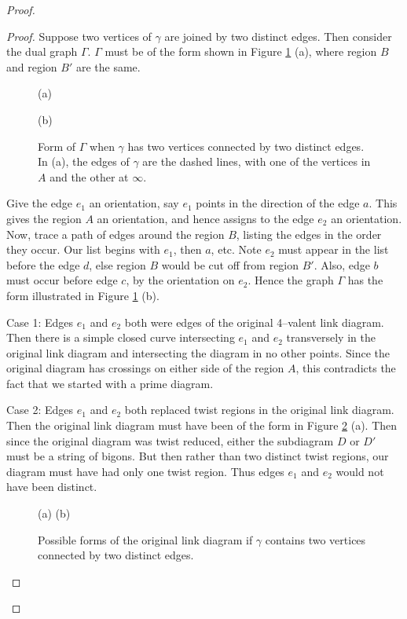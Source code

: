 \begin{proof}
\begin{proof}
Suppose two vertices of $\gamma$ are joined by two distinct edges.
Then consider the dual graph $\Gamma$.  $\Gamma$ must be of the form
shown in Figure \ref{fig:Andr_double_edge} (a), where region $B$ and
region $B'$ are the same.

\begin{figure}
  \begin{center}
    (a)
  
  \hspace{.5in}
  (b)
  
 
  \end{center}
  \caption{Form of $\Gamma$ when $\gamma$ has two vertices
  connected by two distinct edges.  In (a), the edges of $\gamma$ are
  the dashed lines, with one of the vertices in $A$ and the other at
  $\infty$.}
  \label{fig:Andr_double_edge}
\end{figure}

Give the edge $e_1$ an orientation, say $e_1$ points in the direction
of the edge $a$.  This gives the region $A$ an orientation, and hence
assigns to the edge $e_2$ an orientation.  Now, trace a path of edges
around the region $B$, listing the edges in the order they occur.  Our
list begins with $e_1$, then $a$, etc.  Note $e_2$ must appear in the
list before the edge $d$, else region $B$ would be cut off from region
$B'$.  Also, edge $b$ must occur before edge $c$, by the orientation
on $e_2$.  Hence the graph $\Gamma$ has the form illustrated in Figure
\ref{fig:Andr_double_edge} (b).

Case 1: Edges $e_1$ and $e_2$ both were edges of the original
4--valent link diagram.  Then there is a simple closed curve
intersecting $e_1$ and $e_2$ transversely in the original link diagram
and intersecting the diagram in no other points.  Since the
original diagram has crossings on either side of the region $A$, this
contradicts the fact that we started with a prime diagram.

Case 2: Edges $e_1$ and $e_2$ both replaced twist regions in the
original link diagram.  Then the original link diagram must have been
of the form in Figure \ref{fig:Andr_double_diag1} (a).  Then since the
original diagram was twist reduced, either the subdiagram $D$ or $D'$
must be a string of bigons.  But then rather than two distinct twist
regions, our diagram must have had only one twist region.  Thus edges
$e_1$ and $e_2$ would not have been distinct.

\begin{figure}
  \begin{center}
    (a) 
  \hspace{.5in}
  (b)
  
  \end{center}
  \caption{Possible forms of the original link diagram if $\gamma$
  contains two vertices connected by two distinct edges.}
  \label{fig:Andr_double_diag1}
\end{figure}



\end{proof}
\end{proof}
